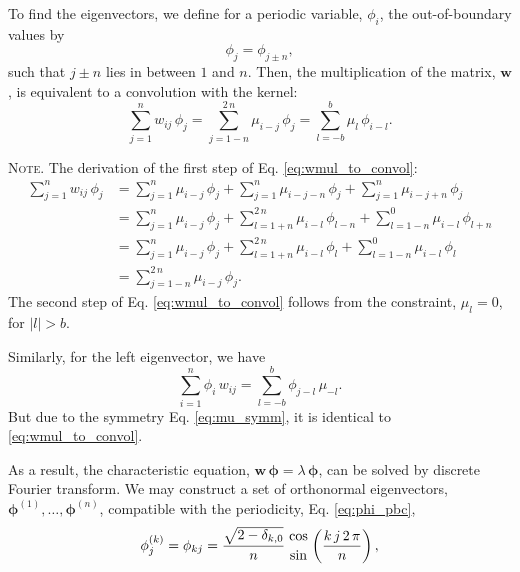 \documentclass[reprint, superscriptaddress, floatfix]{revtex4-1}
\newcommand{\note}[1]{{\color{DarkGreen}\footnotesize \textsc{Note.} #1}}
\begin{document}
To find the eigenvectors,
we define for a periodic variable, $\phi_i$,
the out-of-boundary values by
%
\begin{equation}
  \phi_j = \phi_{j \pm n},
\label{eq:phi_pbc}
\end{equation}
%
such that $j \pm n$ lies in between $1$ and $n$.
%
Then, the multiplication of the matrix, $\mathbf w$,
is equivalent to a convolution with the kernel:
%
\begin{equation}
  \sum_{ j = 1 }^n
    w_{ij} \, \phi_j
  =
  \sum_{ j = 1 - n }^{ 2 \, n }
    \mu_{i - j} \, \phi_j
  =
  \sum_{ l = -b }^{ b }
    \mu_l \, \phi_{ i - l}
  .
\label{eq:wmul_to_convol}
\end{equation}
%
\note{The derivation of the first step of
  Eq. \eqref{eq:wmul_to_convol}:
$$
\begin{aligned}
  \sum_{j = 1}^n
    w_{ij} \, \phi_j
  &=
  \sum_{j = 1}^n
    \mu_{i - j} \, \phi_j
  +
  \sum_{j = 1}^n
    \mu_{i - j - n} \, \phi_j
  +
  \sum_{j = 1}^n
    \mu_{i - j + n} \, \phi_j
  \\
  &=
  \sum_{j = 1}^n
    \mu_{i - j} \, \phi_j
  +
  \sum_{l = 1+n}^{2 \, n}
    \mu_{i - l} \, \phi_{l - n}
  +
  \sum_{l = 1-n}^0
    \mu_{i - l} \, \phi_{l + n}
  \\
  &=
  \sum_{j = 1}^n
    \mu_{i - j} \, \phi_j
  +
  \sum_{l = 1+n}^{2 \, n}
    \mu_{i - l} \, \phi_{l}
  +
  \sum_{l = 1-n}^0
    \mu_{i - l} \, \phi_{l}
  \\
  &=
  \sum_{j = 1-n}^{2 \, n}
    \mu_{i - j} \, \phi_j
  .
\end{aligned}
$$
The second step of Eq. \eqref{eq:wmul_to_convol}
follows from the constraint, $\mu_l = 0$, for $|l| > b$.

Similarly,
for the left eigenvector, we have
$$
  \sum_{ i = 1 }^n
    \phi_i \, w_{ij}
  =
  \sum_{ l = -b }^b
    \phi_{j - l} \, \mu_{-l}
  .
$$
But due to the symmetry Eq. \eqref{eq:mu_symm},
it is identical to \eqref{eq:wmul_to_convol}.
}
%
As a result, the characteristic equation,
$\mathbf w \, \pmb\phi = \lambda \, \pmb\phi$,
can be solved by discrete Fourier transform.
%
We may construct a set of orthonormal eigenvectors,
$\pmb\phi^{(1)}, \dots, \pmb\phi^{(n)}$,
compatible with the periodicity, Eq. \eqref{eq:phi_pbc},
%
\begin{equation}
  \phi^{(k)}_j
  =
  \phi_{kj}
  =
  \frac{ \sqrt{ 2 - \delta_{k,0} } } { n }
  \,
  {\cos \atop \sin}
  \left(
    \frac{ k \, j \, 2 \, \pi }
         {      n             }
  \right)
  ,
  \notag
\end{equation}
\end{document}
